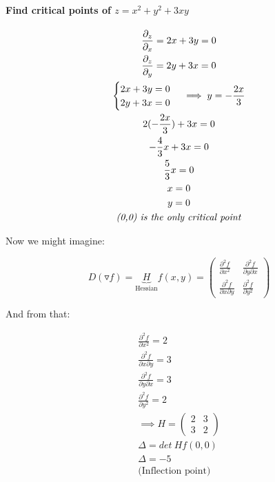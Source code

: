 \documentclass[11pt,fleqn]{book} %
\begin{document}

\paragraph{Find critical points of $z = x^2 + y^2 + 3xy$}

\begin{gather}
    \frac{\partial_z}{\partial_x} = 2x + 3y = 0 \\
    \frac{\partial_z}{\partial_y} = 2y + 3x = 0 \\
    \begin{cases}
        2x + 3y = 0 \\
        2y + 3x = 0
    \end{cases} \implies
    y = - \frac{2x}{3} \\
    2(- \frac{2x}{3}) + 3x = 0 \\
    - \frac{4}{3}x + 3x = 0 \\
    \frac{5}{3} x = 0 \\
    x = 0 \\
    y = 0 \\
    \text{\textit{(0,0) is the only critical point}}
\end{gather}

Now we might imagine:

$$D(\triangledown f) = \underbrace{H}_{\text{Hessian}} f(x,y) = 
\begin{pmatrix}
    \frac{\partial^2 f}{\partial x^2} & \frac{\partial^2 f}{\partial y \partial x} \\
    \frac{\partial^2 f}{\partial x \partial y} & \frac{\partial^2 f}{\partial y^2} 
\end{pmatrix}$$

And from that:

\begin{gather}
    \frac{\partial^2 f}{\partial x^2} = 2 \\
    \frac{\partial^2 f}{\partial x \partial y} = 3 \\
    \frac{\partial^2 f}{\partial y \partial x} = 3 \\
    \frac{\partial^2 f}{\partial y^2} = 2 \\
    \implies H = \begin{pmatrix}
        2 & 3 \\
        3 & 2
    \end{pmatrix} \\
    \Delta = det \ Hf (0,0) \\
    \Delta = -5 \\ \text{(Inflection point)}
\end{gather}
\end{document}
